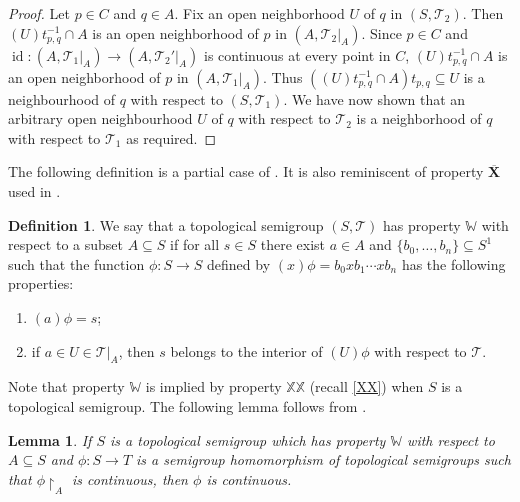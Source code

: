 \documentclass[11pt]{amsart}
\newtheorem{lemma}[theorem]{Lemma}
\theoremstyle{definition}
\newtheorem{definition}[theorem]{Definition}
\newcommand{\Tau}{\mathcal T}
\newcommand{\id}{\operatorname{id}}
\begin{document}
\begin{proof}
    Let \(p\in C\) and \(q\in A\). Fix an open neighborhood \(U\) of \(q\) in \((S, \Tau_2)\). Then
    \((U)t_{p, q}^{-1}\cap A\) is an open neighborhood of \(p\) in \((A, \Tau_2|_A)\). Since $p\in C$ and \(\id:(A, \Tau_1|_A)\to (A, \Tau_2'|_A)\) is continuous at every point in \(C\), \((U)t_{p, q}^{-1}\cap A\) is an open neighborhood of \(p\) in \((A, \Tau_1|_A)\). Thus \(((U)t_{p, q}^{-1}\cap A)t_{p, q}\subseteq U\) is a neighbourhood of \(q\) with respect to \((S, \Tau_1)\).
    We have now shown that an arbitrary open neighbourhood \(U\) of \(q\) with respect to \(\Tau_2\) is a neighborhood of \(q\) with respect to \(\Tau_1\) as required.
\end{proof}


 
The following definition is a partial case of \cite[Definition 7.5]{LunaPhD}. It is also  reminiscent of property \(\overline{\mathbf{X}}\) used in \cite{PiSc}.


\begin{definition}
    We say that a topological semigroup \((S,\Tau)\) has property \(\mathbb W\) with respect to a subset \(A\subseteq S\) if for all \(s\in S\) there exist $a\in A$ and $\{b_0,\ldots,b_n\}\subseteq S^1$ such that the function $\phi: S\rightarrow S$ defined by $(x)\phi=b_0xb_1\cdots xb_n$ has the following properties:
    \begin{enumerate}[\rm(1)]
    \item $(a)\phi=s$;
    \item if \(a\in U\in \Tau|_A\), then \(s\) belongs to the interior of \( (U)\phi\) with respect to \(\Tau\).
    \end{enumerate}
\end{definition}

Note that property \(\mathbb W\) is implied by property $\mathbb{XX}$ (recall \cref{XX}) when \(S\) is a topological semigroup. The following lemma follows from \cite[Lemma 7.6]{LunaPhD}.

\begin{lemma}\label{propertyW}
    If \(S\) is a topological semigroup which has property \(\mathbb W\) with respect to \(A\subseteq S\) and \(\phi:S\to T\) is a semigroup homomorphism of topological semigroups such that \(\phi{\restriction}_A\) is continuous, then \(\phi\) is continuous.
\end{lemma}
\end{document}
